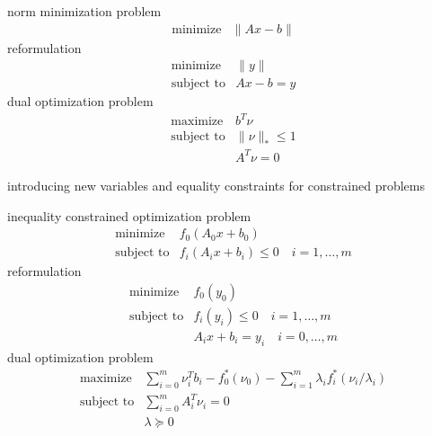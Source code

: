 \documentclass[17pt,landscape]{foils}
\begin{document}
{	\item
		norm minimization problem
		$$
			\begin{array}{ll}
				\mbox{minimize} &
					\|Ax-b\|
			\end{array}
		$$
		\bit
		\iitem
			reformulation
			$$
				\begin{array}{ll}
					\mbox{minimize} &
						\|y\|
					\\
					\mbox{subject to} &
						Ax - b = y
				\end{array}
			$$
		\iitem
			dual optimization problem
			$$
				\begin{array}{ll}
					\mbox{maximize} &
						b^T \nu
					\\
					\mbox{subject to} &
						\|\nu\|_\ast \leq 1
					\\ &
						A^T \nu =0
				\end{array}
			$$
		\eit
	\eit
\eit
\vfill



\bit
\item
	introducing new variables and equality constraints
	for constrained problems

	\bit
	\item
		inequality constrained optimization problem
			$$
				\begin{array}{ll}
					\mbox{minimize} &
						f_0(A_0x+b_0)
					\\
					\mbox{subject to} &
						f_i(A_ix+b_i) \leq 0\quad i=1,\ldots,m
				\end{array}
			$$
	\vitem
		reformulation
			$$
				\begin{array}{ll}
					\mbox{minimize} &
						f_0(y_0)
					\\
					\mbox{subject to} &
						f_i(y_i) \leq 0\quad i=1,\ldots,m
					\\ &
						A_i x + b_i = y_i\quad i=0,\ldots,m
				\end{array}
			$$
	\vitem
		dual optimization problem
			$$
				\begin{array}{ll}
					\mbox{maximize} &
						\sum_{i=0}^m \nu_i^T b_i - f_0^\ast(\nu_0)
						- \sum_{i=1}^m \lambda_i f_i^\ast(\nu_i/\lambda_i)
					\\
					\mbox{subject to} &
						\sum_{i=0}^m A_i^T \nu_i = 0
					\\ &
						\lambda \succeq 0
				\end{array}
			$$
	\eit
\eit
\vfill

\myfoilhead{}

}
\end{document}
